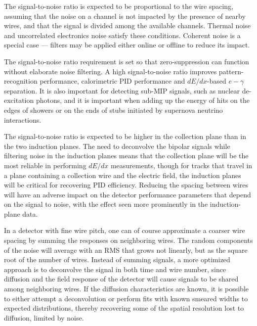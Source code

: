 The signal-to-noise ratio is expected to be proportional to the wire
spacing, assuming that the noise on a channel is not impacted by the
presence of nearby wires, and that the signal is divided among the
available channels.  Thermal noise and uncorrelated electronics noise
satisfy these conditions.  Coherent noise is a special case ---
filters may be applied either online or offline to reduce its impact.

The signal-to-noise ratio requirement is set so that zero-suppression
can function without elaborate noise filtering.  A high signal-to-noise 
ratio %
improves pattern-recognition
performance, calorimetric PID performance and $dE/dx$-based
$e-\gamma$ separation.  %
It is also important %
for detecting sub-MIP signals, such as nuclear de-excitation photons, and
it is important when adding up the energy of hits on the edges of
showers or on the ends of stubs initiated by supernova neutrino
interactions.  

The signal-to-noise ratio is expected to be higher in
the collection plane than in the two induction planes.  The need to
deconvolve the bipolar signals while filtering noise in the induction
planes means that the collection plane will be the most reliable in
performing $dE/dx$ measurements, though for tracks that travel in a
plane containing a collection wire and the electric field, the
induction planes will be critical for recovering PID efficiency.
Reducing the spacing between wires will have an adverse impact on the
detector performance parameters that depend on the signal to noise,
with the effect seen more prominently in the induction-plane data.

In a detector with fine wire pitch, one can of course approximate a
coarser wire spacing by summing the responses on neighboring wires.
The random components of the noise will average with an RMS that grows not linearly, but 
as the square root of the number of wires. %
Instead of summing signals, a more optimized approach is to deconvolve
the signal in both time and wire number, since %
diffusion and the field
response of the detector will cause signals to be shared among
neighboring wires.  If the diffusion characteristics are known, it is possible to either attempt
a deconvolution %
or perform fits with known smeared widths to expected distributions,
thereby recovering some of the
spatial resolution lost to diffusion,  limited by noise.

